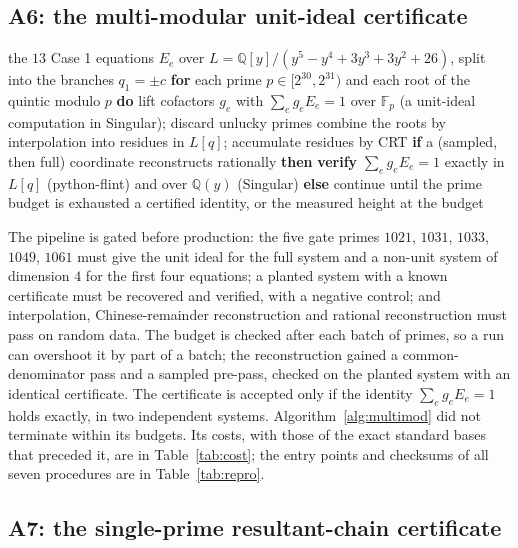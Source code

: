 \documentclass[11pt]{article}
\theoremstyle{remark}
\newcommand{\Q}{\mathbb{Q}}
\begin{document}
\subsection{A6: the multi-modular unit-ideal certificate}

\begin{algorithm}[t]
\caption{A6, the multi-modular cofactor certificate for Case 1 (EXP-141 to EXP-143)}\label{alg:multimod}
\begin{algorithmic}[1]
\Require the $13$ Case 1 equations $E_e$ over $L=\Q[y]/(y^5-y^4+3y^3+3y^2+26)$, split into the branches $q_1=\pm c$
\State \textbf{for} each prime $p\in[2^{30},2^{31})$ and each root of the quintic modulo $p$ \textbf{do}
\State \quad lift cofactors $g_e$ with $\sum_e g_e E_e=1$ over $\mathbb F_p$ (a unit-ideal computation in Singular); discard unlucky primes
\State combine the roots by interpolation into residues in $L[q]$; accumulate residues by CRT
\State \textbf{if} a (sampled, then full) coordinate reconstructs rationally \textbf{then} \textbf{verify} $\sum_e g_eE_e=1$ exactly in $L[q]$ (python-flint) and over $\Q(y)$ (Singular)
\State \textbf{else} continue until the prime budget is exhausted
\Ensure a certified identity, or the measured height at the budget
\end{algorithmic}
\end{algorithm}

The pipeline is gated before production: the five gate primes $1021$, $1031$, $1033$, $1049$, $1061$ must give the unit ideal for the full system and a
non-unit system of dimension $4$ for the first four equations; a planted system with a known certificate must be recovered and verified, with a negative control;
and interpolation, Chinese-remainder reconstruction and rational reconstruction must pass on random data. The budget is checked after each batch of primes, so a run can
overshoot it by part of a batch; the reconstruction gained a common-denominator pass and a sampled pre-pass, checked on the planted system with an identical certificate. The
certificate is accepted only if the identity $\sum_e g_eE_e=1$ holds exactly, in two independent systems. Algorithm~\ref{alg:multimod} did not terminate within its budgets. Its costs, with those of the exact
standard bases that preceded it, are in Table~\ref{tab:cost}; the entry points and checksums of all seven
procedures are in Table~\ref{tab:repro}.

\subsection{A7: the single-prime resultant-chain certificate}\label{sec:a7}
\end{document}
